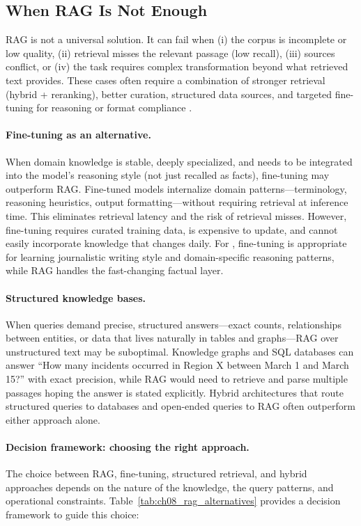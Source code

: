 \subsection{When RAG Is Not Enough}
RAG is not a universal solution. It can fail when (i) the corpus is incomplete or low quality, (ii) retrieval misses the relevant passage (low recall), (iii) sources conflict, or (iv) the task requires complex transformation beyond what retrieved text provides. These cases often require a combination of stronger retrieval (hybrid + reranking), better curation, structured data sources, and targeted fine-tuning for reasoning or format compliance \cite{Thakur2021BEIR,Borgeaud2022RETRO}.

\paragraph{Fine-tuning as an alternative.}
When domain knowledge is stable, deeply specialized, and needs to be integrated into the model's reasoning style (not just recalled as facts), fine-tuning may outperform RAG. Fine-tuned models internalize domain patterns---terminology, reasoning heuristics, output formatting---without requiring retrieval at inference time. This eliminates retrieval latency and the risk of retrieval misses. However, fine-tuning requires curated training data, is expensive to update, and cannot easily incorporate knowledge that changes daily. For \ishtar{}, fine-tuning is appropriate for learning journalistic writing style and domain-specific reasoning patterns, while RAG handles the fast-changing factual layer.

\paragraph{Structured knowledge bases.}
When queries demand precise, structured answers---exact counts, relationships between entities, or data that lives naturally in tables and graphs---RAG over unstructured text may be suboptimal. Knowledge graphs and SQL databases can answer ``How many incidents occurred in Region X between March 1 and March 15?'' with exact precision, while RAG would need to retrieve and parse multiple passages hoping the answer is stated explicitly. Hybrid architectures that route structured queries to databases and open-ended queries to RAG often outperform either approach alone.

\paragraph{Decision framework: choosing the right approach.}
The choice between RAG, fine-tuning, structured retrieval, and hybrid approaches depends on the nature of the knowledge, the query patterns, and operational constraints. Table~\ref{tab:ch08_rag_alternatives} provides a decision framework to guide this choice:

